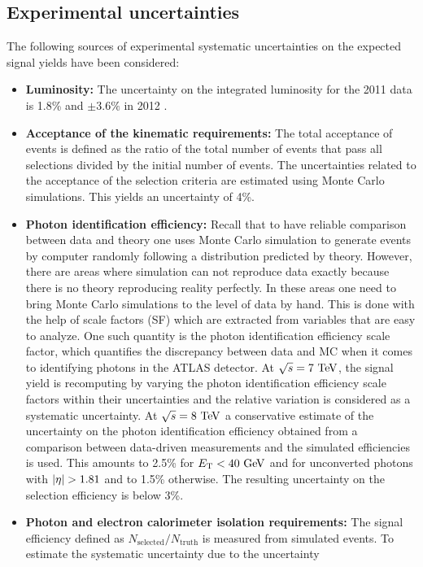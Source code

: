 \subsection{Experimental uncertainties}
The following sources of experimental systematic uncertainties on the expected
signal yields have been considered:
\begin{itemize}
\item \textbf{Luminosity:}
The uncertainty on the integrated luminosity for the 2011 data is 1.8\% 
and $\pm 3.6\%$ in 2012 \cite{ATLAS:2012roa}.
%
\item \textbf{Acceptance of the kinematic requirements:}
The total acceptance of \HToZg events is defined as the ratio of the total number
of \HToZg events that pass all selections divided by the initial number of \HToZg
events. The uncertainties related to the acceptance of the selection criteria are
estimated using Monte Carlo simulations. This yields an uncertainty of 4\%.
%
\item \textbf{Photon identification efficiency:} 
Recall that to have reliable comparison between data and theory one uses Monte Carlo
simulation to generate events by computer randomly following a distribution predicted
by theory. However, there are areas where simulation can not reproduce data exactly
because there is no theory reproducing reality perfectly. In these areas one
need to bring Monte Carlo simulations to the level of data by hand. This is done
with the help of scale factors (SF) which are extracted from variables that are
easy to analyze. One such quantity is the photon identification efficiency scale
factor, which quantifies the discrepancy between data and MC when it comes to
identifying photons in the ATLAS detector. At $\rts = 7 \TeV$, the signal
yield is recomputing by varying the photon identification efficiency scale factors
within their uncertainties and the relative variation is considered as a systematic
uncertainty. At $\rts = 8 \TeV$ a conservative estimate of the uncertainty on the
photon identification efficiency obtained from a comparison between data-driven
measurements and the simulated efficiencies is used. This amounts to 2.5\% for
$\et < 40 \GeV$ and for unconverted photons with $\abseta > 1.81$ and to 1.5\%
otherwise. The resulting uncertainty on the \HToZg selection efficiency is below
3\%.
%
\item \textbf{Photon and electron calorimeter isolation requirements:}
The signal efficiency defined as $N_{\text{selected}}/N_{\text{truth}}$ 
is measured from simulated events. 
To estimate the systematic uncertainty due to the uncertainty

\end{itemize}
